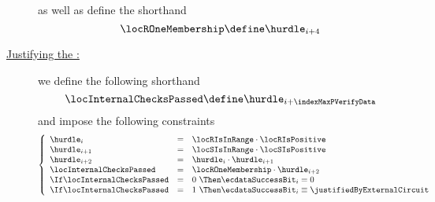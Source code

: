 \begin{description}
\[{              }
        \]
        as well as define the shorthand
        \[
            \locROneMembership  \define \hurdle_{i+4}
        \]
    \item[\underline{Justifying the \ecdataSuccessBit{}:}]
        we define the following shorthand
        \[
            \locInternalChecksPassed \define \hurdle _{i + \indexMaxPVerifyData} \\
        \]
        and impose the following constraints
        \[
            \left\{ \begin{array}{lcl}
                \hurdle _{i}                 & = & \locRIsInRange \cdot \locRIsPositive                                \\
                \hurdle _{i + 1}             & = & \locSIsInRange  \cdot \locSIsPositive                               \\
                \hurdle _{i + 2}             & = & \hurdle _{i} \cdot \hurdle _{i + 1}                                 \\
                \locInternalChecksPassed     & = & \locROneMembership \cdot \hurdle _{i + 2}                           \\
                \If \locInternalChecksPassed & = & 0 ~ \Then \ecdataSuccessBit _{i} = 0                                \\
                \If \locInternalChecksPassed & = & 1 ~ \Then \ecdataSuccessBit _{i} \equiv \justifiedByExternalCircuit \\
            \end{array} \right.
        \]
\end{description}
